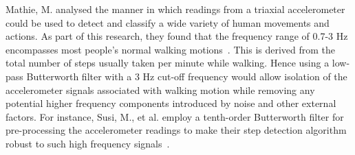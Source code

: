 \documentclass[12pt,a4paper]{report}
\begin{document}
Mathie, M. analysed the manner in which readings from a triaxial accelerometer could be used to detect and classify a wide variety of human movements and actions. As part of this research, they found that the frequency range of 0.7-3 Hz encompasses most people's normal walking motions~\cite[p.248]{walkingFrequency}. This is derived from the total number of steps usually taken per minute while walking. Hence using a low-pass Butterworth filter with a 3 Hz cut-off frequency would allow isolation of the accelerometer signals associated with walking motion while removing any potential higher frequency components introduced by noise and other external factors. For instance, Susi, M., et al. employ a tenth-order Butterworth filter for pre-processing the accelerometer readings to make their step detection algorithm robust to such high frequency signals~\cite[p.1552]{susi2013motion}.  
\end{document}
